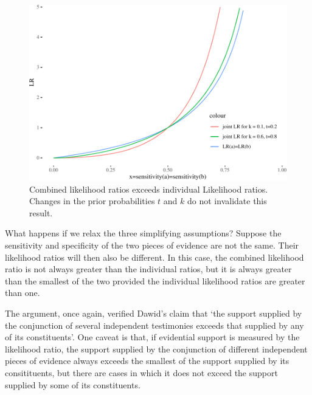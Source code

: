 \documentclass[10pt,dvipsnames,enabledeprecatedfontcommands]{scrartcl}
\begin{document}
\begin{figure}


\begin{center}\includegraphics[width=0.9\linewidth]{conjunction-paradox_files/figure-latex/unnamed-chunk-7-1} \end{center}

\caption{Combined likelihood ratios exceeds individual Likelihood ratios. Changes in the prior 
probabilities $t$ and $k$ do not invalidate this result.}
\label{fig:jointLRMarcello}
\end{figure}

What happens if we relax the three simplifying assumptions? Suppose the
sensitivity and specificity of the two pieces of evidence are not the
same. Their likelihood ratios will then also be different. In this case,
the combined likelihood ratio is not always greater than the individual
ratios, but it is always greater than the smallest of the two provided
the individual likelihood ratios are greater than one.


The argument, once again, verified Dawid's claim that `the support
supplied by the conjunction of several independent testimonies exceeds
that supplied by any of its constituents'. One caveat is that, if
evidential support is measured by the likelihood ratio, the support
supplied by the conjunction of different independent pieces of evidence
always exceeds the smallest of the support supplied by its
consitituents, but there are cases in which it does not exceed the
support supplied by some of its constituents.
\end{document}
